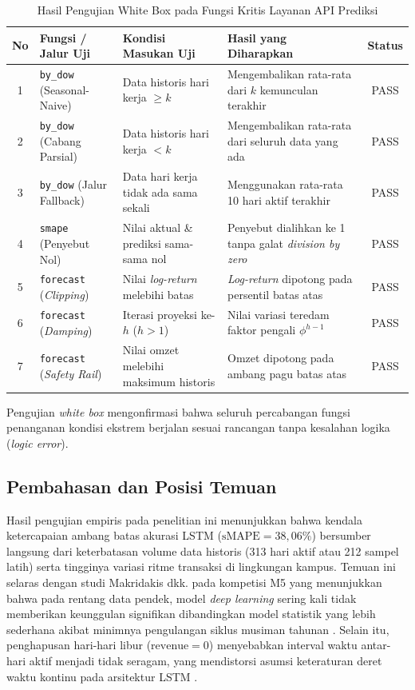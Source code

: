 \documentclass[10pt,a4paper]{article}
\begin{document}
\begin{table}[htbp]
  \centering
  \caption{Hasil Pengujian White Box pada Fungsi Kritis Layanan API Prediksi}
  \label{tab:whitebox}
  \fontsize{8pt}{10pt}\selectfont
  \begin{tabularx}{\textwidth}{clXXc}
    \toprule
    \textbf{No} & \textbf{Fungsi / Jalur Uji} & \textbf{Kondisi Masukan Uji} & \textbf{Hasil yang Diharapkan} & \textbf{Status} \\
    \midrule
    1 & \texttt{by\_dow} (Seasonal-Naive) & Data historis hari kerja $\ge k$ & Mengembalikan rata-rata dari $k$ kemunculan terakhir & PASS \\
    2 & \texttt{by\_dow} (Cabang Parsial) & Data historis hari kerja $< k$   & Mengembalikan rata-rata dari seluruh data yang ada & PASS \\
    3 & \texttt{by\_dow} (Jalur Fallback) & Data hari kerja tidak ada sama sekali & Menggunakan rata-rata 10 hari aktif terakhir & PASS \\
    4 & \texttt{smape} (Penyebut Nol)     & Nilai aktual \& prediksi sama-sama nol & Penyebut dialihkan ke 1 tanpa galat \textit{division by zero} & PASS \\
    5 & \texttt{forecast} (\textit{Clipping})  & Nilai \textit{log-return} melebihi batas & \textit{Log-return} dipotong pada persentil batas atas & PASS \\
    6 & \texttt{forecast} (\textit{Damping})   & Iterasi proyeksi ke-$h$ ($h > 1$) & Nilai variasi teredam faktor pengali $\phi^{h-1}$ & PASS \\
    7 & \texttt{forecast} (\textit{Safety Rail})& Nilai omzet melebihi maksimum historis & Omzet dipotong pada ambang pagu batas atas & PASS \\
    \bottomrule
  \end{tabularx}
\end{table}

Pengujian \textit{white box} mengonfirmasi bahwa seluruh percabangan fungsi penanganan kondisi ekstrem berjalan sesuai rancangan tanpa kesalahan logika (\textit{logic error}).

\subsection{Pembahasan dan Posisi Temuan}
Hasil pengujian empiris pada penelitian ini menunjukkan bahwa kendala ketercapaian ambang batas akurasi LSTM ($\text{sMAPE} = 38,06\%$) bersumber langsung dari keterbatasan volume data historis (313 hari aktif atau 212 sampel latih) serta tingginya variasi ritme transaksi di lingkungan kampus. Temuan ini selaras dengan studi Makridakis dkk. pada kompetisi M5 yang menunjukkan bahwa pada rentang data pendek, model \textit{deep learning} sering kali tidak memberikan keunggulan signifikan dibandingkan model statistik yang lebih sederhana akibat minimnya pengulangan siklus musiman tahunan \cite{makridakis2022}. Selain itu, penghapusan hari-hari libur ($\text{revenue} = 0$) menyebabkan interval waktu antar-hari aktif menjadi tidak seragam, yang mendistorsi asumsi keteraturan deret waktu kontinu pada arsitektur LSTM \cite{box2015}.
\end{document}
